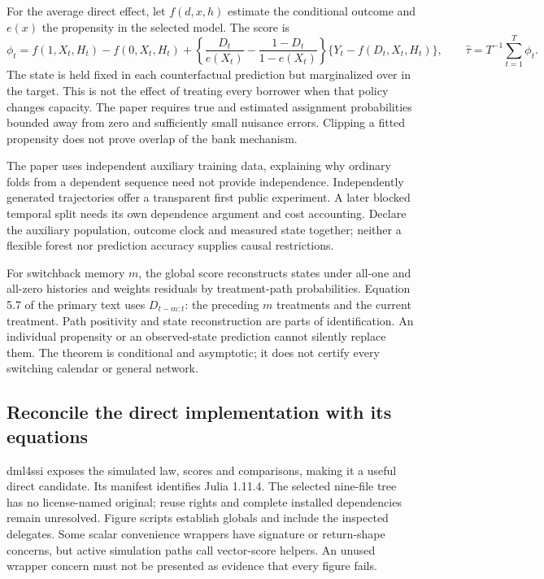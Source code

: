 For the average direct effect, let $f(d,x,h)$ estimate the conditional outcome
and $e(x)$ the propensity in the selected model. The score is
\[
 \phi_t=f(1,X_t,H_t)-f(0,X_t,H_t)
 +\left\{\frac{D_t}{e(X_t)}-\frac{1-D_t}{1-e(X_t)}\right\}
   \{Y_t-f(D_t,X_t,H_t)\},\qquad
 \widehat\tau=T^{-1}\sum_{t=1}^T\phi_t.
\]
The state is held fixed in each counterfactual prediction but marginalized
over in the target. This is not the effect of treating every borrower when
that policy changes capacity. The paper requires true and estimated assignment
probabilities bounded away from zero and sufficiently small nuisance errors.
Clipping a fitted propensity does not prove overlap of the bank mechanism.
\citep{exec25_onet_paper}

The paper uses independent auxiliary training data, explaining why ordinary
folds from a dependent sequence need not provide independence. Independently
generated trajectories offer a transparent first public experiment. A later
blocked temporal split needs its own dependence argument and cost accounting.
Declare the auxiliary population, outcome clock and measured state together;
neither a flexible forest nor prediction accuracy supplies causal restrictions.
\citep{exec25_onet_paper,exec25_onet_choice}

For switchback memory $m$, the global score reconstructs states under all-one
and all-zero histories and weights residuals by treatment-path probabilities.
Equation 5.7 of the primary text uses $D_{t-m:t}$: the preceding $m$ treatments
and the current treatment. Path positivity and state reconstruction are parts
of identification. An individual propensity or an observed-state prediction
cannot silently replace them. The theorem is conditional and asymptotic; it
does not certify every switching calendar or general network.
\citep{exec25_onet_paper}

\subsection{Reconcile the direct implementation with its equations}

dml4ssi exposes the simulated law, scores and comparisons, making it a useful
direct candidate. Its manifest identifies Julia 1.11.4. The selected nine-file
tree has no license-named original; reuse rights and complete installed
dependencies remain unresolved. Figure scripts establish globals and include
the inspected delegates. Some scalar convenience wrappers have signature or
return-shape concerns, but active simulation paths call vector-score helpers.
An unused wrapper concern must not be presented as evidence that every figure
fails.\citep{exec25_onet_dml}

